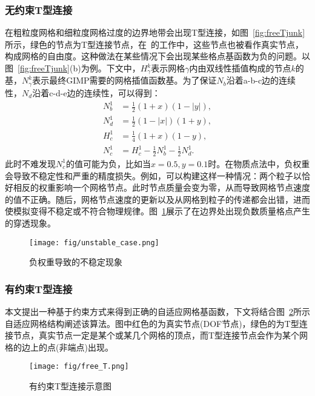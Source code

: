 \subsubsection{无约束T型连接}
在粗粒度网格和细粒度网格过度的边界地带会出现T型连接，如图~\ref{fig:freeTjunk}所示，绿色的节点为T型连接节点，在~\cite{LIAN2015291}的工作中，这些节点也被看作真实节点，构成网格的自由度。这种做法在某些情况下会出现某些格点基函数为负的问题。以图~\ref{fig:freeTjunk}(b)为例。下文中，$H_\gamma^k$表示网格$\gamma$内由双线性插值构成的节点$k$的基，$N_\gamma^k$表示最终GIMP需要的网格插值函数基。为了保证$N_b$沿着a-b-c边的连续性，$N_d$沿着c-d-e边的连续性，可以得到：
\begin{equation}
    \begin{aligned}
        N_b^1 &=\frac{1}{2}(1+x)(1-|y|), \\
        N_d^1 &=\frac{1}{2}(1-|x|)(1+y), \\
        H_c^1 &= \frac{1}{4}(1 + x)( 1 - y), \\
        N_c^1 &= H_c^1 - \frac{1}{2}N_b^1 - \frac{1}{2}N_d^1.
    \end{aligned}
\end{equation}
此时不难发现$N_c^1$的值可能为负，比如当$x=0.5,y=0.1$时。在物质点法中，负权重会导致不稳定性和严重的精度损失。例如，可以构建这样一种情况：两个粒子以恰好相反的权重影响一个网格节点。此时节点质量会变为零，从而导致网格节点速度的值不正确。随后，网格节点速度的更新以及从网格到粒子的传递都会出错，进而使模拟变得不稳定或不符合物理规律。图~\ref{fig:unstable}展示了在边界处出现负数质量格点产生的穿透现象。

\begin{figure}[H]
    \centering
    \texttt{[image: fig/unstable\_case.png]}
    \caption{负权重导致的不稳定现象}
    \label{fig:unstable}
\end{figure}
\subsubsection{有约束T型连接}
本文提出一种基于约束方式来得到正确的自适应网格基函数，下文将结合图~\ref{fig:free_T}所示自适应网格结构阐述该算法。图中红色的为真实节点(DOF节点)，绿色的为T型连接节点，真实节点一定是某个或某几个网格的顶点，而T型连接节点会作为某个网格的边上的点(非端点)出现。


\begin{figure}[H]
    \centering
    \texttt{[image: fig/free\_T.png]}
    \caption{有约束T型连接示意图}
    \label{fig:free_T}
\end{figure}


